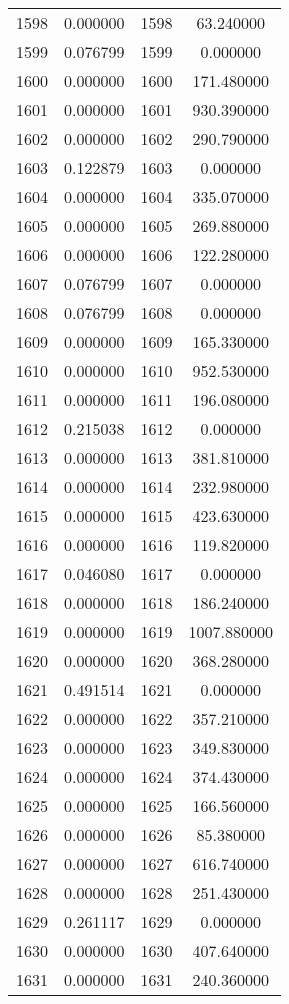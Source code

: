 \documentclass[12pt]{article}
\begin{document}
\begin{longtable}{@{}cccc@{}}
1598 & 0.000000 & 1598 & 63.240000 \\
1599 & 0.076799 & 1599 & 0.000000 \\
1600 & 0.000000 & 1600 & 171.480000 \\
1601 & 0.000000 & 1601 & 930.390000 \\
1602 & 0.000000 & 1602 & 290.790000 \\
1603 & 0.122879 & 1603 & 0.000000 \\
1604 & 0.000000 & 1604 & 335.070000 \\
1605 & 0.000000 & 1605 & 269.880000 \\
1606 & 0.000000 & 1606 & 122.280000 \\
1607 & 0.076799 & 1607 & 0.000000 \\
1608 & 0.076799 & 1608 & 0.000000 \\
1609 & 0.000000 & 1609 & 165.330000 \\
1610 & 0.000000 & 1610 & 952.530000 \\
1611 & 0.000000 & 1611 & 196.080000 \\
1612 & 0.215038 & 1612 & 0.000000 \\
1613 & 0.000000 & 1613 & 381.810000 \\
1614 & 0.000000 & 1614 & 232.980000 \\
1615 & 0.000000 & 1615 & 423.630000 \\
1616 & 0.000000 & 1616 & 119.820000 \\
1617 & 0.046080 & 1617 & 0.000000 \\
1618 & 0.000000 & 1618 & 186.240000 \\
1619 & 0.000000 & 1619 & 1007.880000 \\
1620 & 0.000000 & 1620 & 368.280000 \\
1621 & 0.491514 & 1621 & 0.000000 \\
1622 & 0.000000 & 1622 & 357.210000 \\
1623 & 0.000000 & 1623 & 349.830000 \\
1624 & 0.000000 & 1624 & 374.430000 \\
1625 & 0.000000 & 1625 & 166.560000 \\
1626 & 0.000000 & 1626 & 85.380000 \\
1627 & 0.000000 & 1627 & 616.740000 \\
1628 & 0.000000 & 1628 & 251.430000 \\
1629 & 0.261117 & 1629 & 0.000000 \\
1630 & 0.000000 & 1630 & 407.640000 \\
1631 & 0.000000 & 1631 & 240.360000 \\

\end{longtable}
\end{document}
